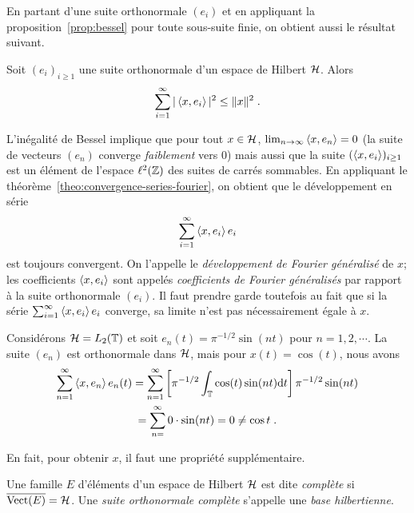 En partant d'une suite orthonormale $(e_i)$ et en appliquant la
proposition~\ref{prop:bessel} pour toute sous-suite finie, on obtient aussi le
r\'{e}sultat suivant.
\begin{corollary}
Soit $(e_i)_{i\geq1}$ une suite orthonormale d'un espace de Hilbert $\mathcal{H}$. Alors
$$
\sum_{i=1}^\infty|\left\langle x, e_i \right\rangle|^2\leq \|x\|^2 \;.
$$
\end{corollary}

L'in\'{e}galit\'{e} de Bessel implique que pour tout $x \in \mathcal{H}$, $\lim_{n \to
  \infty} \left\langle x, e_n \right\rangle= 0$ (la suite de vecteurs $(e_n)$ converge
\emph{faiblement} vers 0) mais aussi que la suite $(\left\langle x, e_i \right\rangle)_{i\geq1}$ est un
\'{e}l\'{e}ment de l'espace $\ell^2(\mathbb{Z})$ des suites de carr\'{e}s sommables.
En appliquant le th\'{e}or\`{e}me~\ref{theo:convergence-series-fourier}, on obtient que
le d\'{e}veloppement en s\'{e}rie
\begin{equation}
\label{eq:developpement-Fourier}
\sum_{i=1}^\infty \left\langle x, e_i \right\rangle e_i
\end{equation}
est toujours convergent. On l'appelle le \emph{d\'{e}veloppement de Fourier
  g\'{e}n\'{e}ralis\'{e}} de $x$; les coefficients $\left\langle x, e_i \right\rangle$ sont appel\'{e}s
\emph{coefficients de Fourier g\'{e}n\'{e}ralis\'{e}s} par rapport \`{a} la suite orthonormale
$(e_i)$.  Il faut prendre garde toutefois au fait que si la s\'{e}rie
$\sum_{i=1}^\infty \left\langle x, e_i \right\rangle e_i$ converge, sa limite n'est pas
n\'{e}cessairement \'{e}gale \`{a} $x$.
\begin{example}
Consid\'{e}rons $\mathcal{H}= L_2(\mathbb{T})$ et soit $e_n(t)= \pi^{-1/2} \sin(n t)$ pour $n=1,2,\cdots$. La suite $(e_n)$ est orthonormale dans $\mathcal{H}$, mais pour $x(t)= \cos(t)$, nous avons
\begin{multline*}
\sum_{n=1}^\infty \left\langle x, e_n \right\rangle e_n(t)= \sum_{n=1}^\infty \left[ \pi^{-1/2}  \int_{\mathbb{T}} \cos(t) \sin(nt) \mathrm{d} t \right] \pi^{-1/2} \sin(nt) \\
= \sum_{n=}^\infty 0 \cdot \sin(nt) = 0 \ne \cos t \;.
\end{multline*}
\end{example}
En fait, pour obtenir $x$, il faut une propri\'{e}t\'{e} suppl\'{e}mentaire.
\begin{definition}
Une famille $E$ d'\'{e}l\'{e}ments d'un espace de Hilbert $\mathcal{H}$ est dite
\emph{compl\`{e}te} si $\overline{\mathrm{Vect}(E)}=\mathcal{H}$. Une \emph{suite orthonormale compl\`{e}te}
s'appelle une \emph{base hilbertienne}.
\end{definition}
